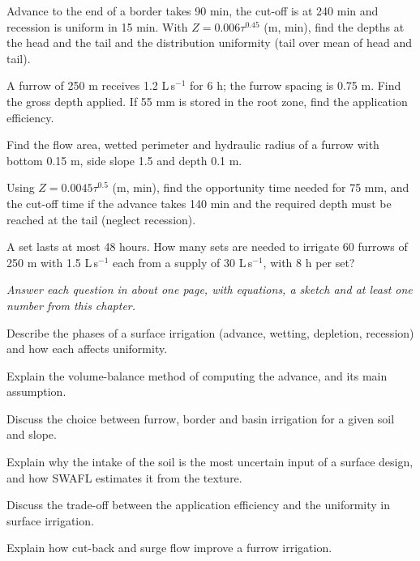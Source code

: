 \begin{exlist}
\item Advance to the end of a border takes 90 min, the cut-off is at 240 min and recession is uniform in 15 min. With $Z=0.006\tau^{0.45}$ (m, min), find the depths at the head and the tail and the distribution uniformity (tail over mean of head and tail).
\item A furrow of 250 m receives 1.2 L\,s$^{-1}$ for 6 h; the furrow spacing is 0.75 m. Find the gross depth applied. If 55 mm is stored in the root zone, find the application efficiency.
\item Find the flow area, wetted perimeter and hydraulic radius of a furrow with bottom 0.15 m, side slope 1.5 and depth 0.1 m.
\item Using $Z=0.0045\tau^{0.5}$ (m, min), find the opportunity time needed for 75 mm, and the cut-off time if the advance takes 140 min and the required depth must be reached at the tail (neglect recession).
\item A set lasts at most 48 hours. How many sets are needed to irrigate 60 furrows of 250 m with 1.5 L\,s$^{-1}$ each from a supply of 30 L\,s$^{-1}$, with 8 h per set?
\end{exlist}
{\small\itshape Answer each question in about one page, with equations, a sketch and at least one number from this chapter.}\par\vspace{3pt}
\begin{exlist}
\item Describe the phases of a surface irrigation (advance, wetting, depletion, recession) and how each affects uniformity.
\item Explain the volume-balance method of computing the advance, and its main assumption.
\item Discuss the choice between furrow, border and basin irrigation for a given soil and slope.
\item Explain why the intake of the soil is the most uncertain input of a surface design, and how SWAFL estimates it from the texture.
\item Discuss the trade-off between the application efficiency and the uniformity in surface irrigation.
\item Explain how cut-back and surge flow improve a furrow irrigation.
\end{exlist}
